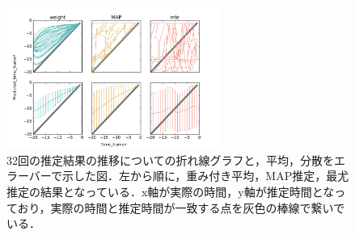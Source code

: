\begin{figure}[htbp]
  \centering
    \includegraphics[width=70mm]{fig/result_line_error.pdf}
  \caption{32回の推定結果の推移についての折れ線グラフと，平均，分散をエラーバーで示した図．左から順に，重み付き平均，MAP推定，最尤推定の結果となっている．x軸が実際の時間，y軸が推定時間となっており，実際の時間と推定時間が一致する点を灰色の棒線で繋いでいる．}
  \label{fig:result_line_error}
\end{figure}

